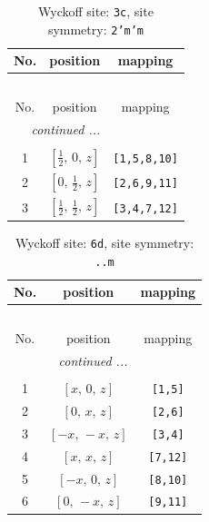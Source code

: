 \documentclass[fleqn,8pt]{jsarticle}
\begin{document}
\begin{longtable}{ccc}
\caption{Wyckoff site: {\tt 3c}, site symmetry: {\tt 2'm'm}}
 \\
 \hline \hline
No. & position & mapping \\ \hline \endfirsthead

\multicolumn{2}{l}{\tablename\ \thetable{}} \\
 \hline \hline
No. & position & mapping \\ \hline \endhead

 \hline \hline
\multicolumn{2}{r}{\footnotesize\it continued ...} \\ \endfoot

 \hline \hline
\multicolumn{2}{r}{} \\ \endlastfoot

1 & $\left[ \frac{1}{2},\, 0,\, z \right]$ & {\tt [1,5,8,10]} \\ \hline
2 & $\left[ 0,\, \frac{1}{2},\, z \right]$ & {\tt [2,6,9,11]} \\ \hline
3 & $\left[ \frac{1}{2},\, \frac{1}{2},\, z \right]$ & {\tt [3,4,7,12]} \\
\end{longtable}
\renewcommand{\arraystretch}{1.2}
\begin{longtable}{ccc}
\caption{Wyckoff site: {\tt 6d}, site symmetry: {\tt ..m}}
 \\
 \hline \hline
No. & position & mapping \\ \hline \endfirsthead

\multicolumn{2}{l}{\tablename\ \thetable{}} \\
 \hline \hline
No. & position & mapping \\ \hline \endhead

 \hline \hline
\multicolumn{2}{r}{\footnotesize\it continued ...} \\ \endfoot

 \hline \hline
\multicolumn{2}{r}{} \\ \endlastfoot

1 & $\left[ x,\, 0,\, z \right]$ & {\tt [1,5]} \\ \hline
2 & $\left[ 0,\, x,\, z \right]$ & {\tt [2,6]} \\ \hline
3 & $\left[ - x,\, - x,\, z \right]$ & {\tt [3,4]} \\ \hline
4 & $\left[ x,\, x,\, z \right]$ & {\tt [7,12]} \\ \hline
5 & $\left[ - x,\, 0,\, z \right]$ & {\tt [8,10]} \\ \hline
6 & $\left[ 0,\, - x,\, z \right]$ & {\tt [9,11]} \\
\end{longtable}
\end{document}
